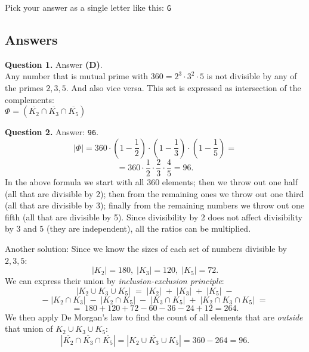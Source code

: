 \documentclass[jou]{apa6}
\begin{document}
Pick your answer as a single letter like this: {\tt G}




\newpage

\subsection{Answers}

\vspace{6pt}
{\bf Question 1.} Answer {\bf (D)}.\\
Any number that is mutual prime with $360 = 2^3\cdot{}3^2\cdot{}5$
is not divisible by any of the primes $2,3,5$. And also vice versa. 
This set is expressed as intersection of the complements:\\
$\Phi = \left( \overline{K_2} \cap \overline{K_3} \cap \overline{K_5} \right)$


\vspace{6pt}
{\bf Question 2.} Answer: {\tt 96}.\\
$${\displaystyle |\Phi| = 360 \cdot \left(1 - \frac{1}{2}\right) \cdot \left(1 - \frac{1}{3}\right) \cdot \left(1 - \frac{1}{5}\right) =}$$
$${\displaystyle  = 360 \cdot \frac{1}{2} \cdot \frac{2}{3} \cdot \frac{4}{5}  = 96}.$$
In the above formula we start with all $360$ elements; then we throw
out one half (all that are divisible by 2); then from the remaining ones 
we throw out one third (all that are divisible by 3); finally from the remaining numbers we throw
out one fifth (all that are divisible by 5). Since divisibility by $2$ does not 
affect divisibility by $3$ and $5$ (they are independent), 
all the ratios can be multiplied.

Another solution: Since we know the sizes of each 
set of numbers divisible by $2,3,5$:
$$|K_2| = 180,\; |K_3| = 120,\; |K_5| = 72.$$
We can express their union by {\em inclusion-exclusion principle}:
$$|K_2 \cup K_3 \cup K_5| \;=\; |K_2| \;+\; |K_3| \;+\; |K_5| \;-$$
$$-\;|K_2 \cap K_3|\;-\;|K_2 \cap K_5|\;-\;|K_3 \cap K_5| \;+\; |K_2 \cap K_3 \cap K_5|  \;=$$
$$=\; 180 + 120 + 72 - 60 - 36 - 24 +12 = 264.$$
We then apply De Morgan's law to find the count of all elements that are {\em outside}
that union of $K_2 \cup K_3 \cup K_5$: 
$$ \left| \overline{K_2} \cap \overline{K_3} \cap \overline{K_5} \right| = 
\left| \overline{K_2 \cup K_3 \cup K_5} \right| =360 - 264 =  96.$$ 
\end{document}

